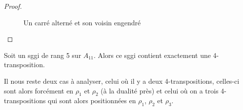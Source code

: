 \begin{proof}
\begin{figure}[H]
\begin{center}
      \caption{Un carré alterné et son voisin engendré}
    \end{center}
  \end{figure}


\end{proof}

\begin{theorem}
  Soit un sggi de rang 5 sur $A_{11}$. Alors ce sggi contient exactement une 4-transposition.
\end{theorem}

Il nous reste deux cas à analyser, celui où il y a deux 4-transpositions, celles-ci sont alors forcément en $\rho_1$ et $\rho_2$ (à la dualité près) et celui où on a trois 4-transpositions qui sont alors positionnées en $\rho_1$, $\rho_2$ et $\rho_3$.

